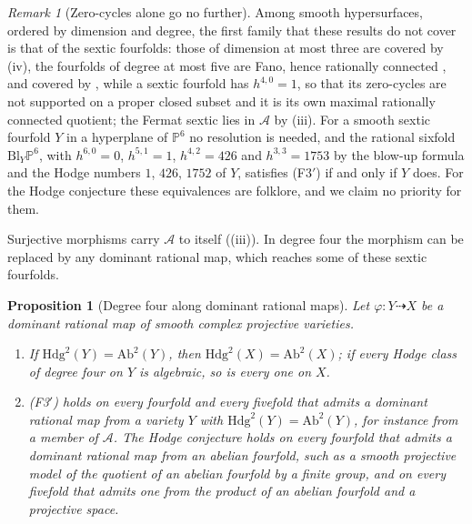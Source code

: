 \documentclass[11pt,reqno]{amsart}
\theoremstyle{plain}
\newtheorem{proposition}[theorem]{Proposition}
\theoremstyle{definition}
\theoremstyle{remark}
\newtheorem{remark}[theorem]{Remark}
\newcommand{\PP}{\mathbb{P}}
\newcommand{\Hdg}{\mathrm{Hdg}}
\begin{document}
\begin{remark}[Zero-cycles alone go no further]
Among smooth hypersurfaces, ordered by dimension and degree, the first
family that these results do not cover is that of the sextic fourfolds:
those of dimension at most three are covered by (iv),
the fourfolds of degree at most five are Fano, hence rationally connected
\cite{Cam92,KMM92}, and covered by , while a sextic
fourfold has $h^{4,0}=1$, so that its zero-cycles are not supported on a
proper closed subset and it is its own maximal rationally connected
quotient; the Fermat sextic lies in $\mathcal{A}$ by
(iii). For a smooth sextic fourfold $Y$ in a
hyperplane of $\PP^{6}$ no resolution is needed, and the rational sixfold
$\mathrm{Bl}_{Y}\PP^{6}$, with $h^{6,0}=0$, $h^{5,1}=1$, $h^{4,2}=426$ and
$h^{3,3}=1753$ by the blow-up formula \cite[\S7.3.3]{Voi02} and the Hodge
numbers $1$, $426$, $1752$ of $Y$, satisfies \textup{(F3$'$)} if and only if
$Y$ does. For the Hodge
conjecture these equivalences are folklore, and we claim no priority for
them.
\end{remark}

Surjective morphisms carry $\mathcal{A}$ to itself ((iii)).
In degree four the morphism can be replaced by any dominant rational map,
which reaches some of these sextic fourfolds.

\begin{proposition}[Degree four along dominant rational maps]
\label{prop:f3primedominant}
Let $\varphi\colon Y\dashrightarrow X$ be a dominant rational map of smooth
complex projective varieties.
\begin{enumerate}[label=\textup{(\roman*)},leftmargin=2.6em,itemsep=2pt]
\item If $\Hdg^{2}(Y)=\mathrm{Ab}^{2}(Y)$, then
  $\Hdg^{2}(X)=\mathrm{Ab}^{2}(X)$; if every Hodge class of degree four on
  $Y$ is algebraic, so is every one on $X$.
\item \textup{(F3$'$)} holds on every fourfold and every fivefold that
  admits a dominant rational map from a variety $Y$ with
  $\Hdg^{2}(Y)=\mathrm{Ab}^{2}(Y)$, for instance from a member of
  $\mathcal{A}$. The Hodge conjecture holds on every fourfold that admits a
  dominant rational map from an abelian fourfold, such as a smooth
  projective model of the quotient of an abelian fourfold by a finite group,
  and on every fivefold that admits one from the product of an abelian
  fourfold and a projective space.
\end{enumerate}
\end{proposition}
\end{document}
